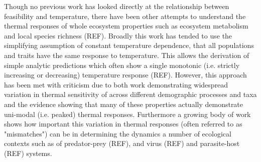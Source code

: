 \documentclass{article}
\begin{document}
Though no previous work has looked directly at the relationship between feasibility and temperature, there have been other attempts to understand the thermal responses of whole ecosystem properties such as ecosystem metabolism and local species richness (REF). Broadly this work has tended to use the simplifying assumption of constant temperature dependence, that all populations and traits have the same response to temperature. This allows the derivation of simple analytic predictions which often show a single monotonic (i.e. strictly increasing or decreasing) temperature response (REF). However, this approach has been met with criticism due to both work demonstrating widespread variation in thermal sensitivity of across different demographic processes and taxa and the evidence showing that many of these properties actually demonstrate uni-modal (i.e. peaked) thermal responses. Furthermore a growing body of work shows how important this variation in thermal responses (often referred to as "mismatches") can be in determining the dynamics a number of ecological contexts such as of predator-prey (REF), and virus (REF) and parasite-host (REF)  systems.  
\end{document}
